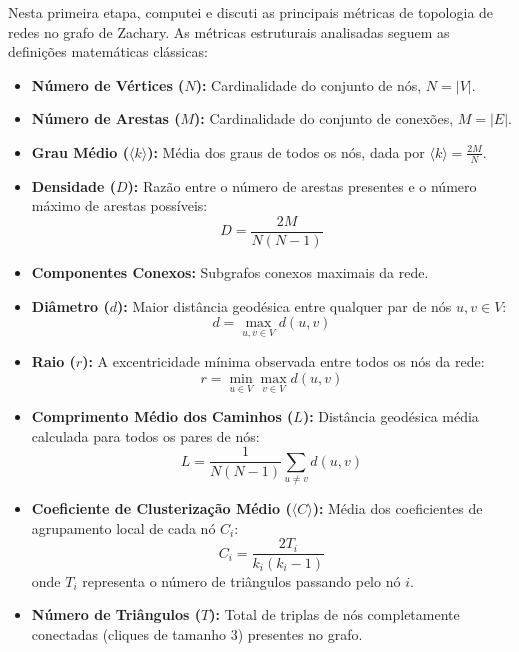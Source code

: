 \documentclass[sigconf]{webmedia}
\begin{document}
Nesta primeira etapa, computei e discuti as principais métricas de topologia de redes no grafo de Zachary. As métricas estruturais analisadas seguem as definições matemáticas clássicas:
\begin{itemize}
    \item \textbf{Número de Vértices ($N$):} Cardinalidade do conjunto de nós, $N = |V|$.
    \item \textbf{Número de Arestas ($M$):} Cardinalidade do conjunto de conexões, $M = |E|$.
    \item \textbf{Grau Médio ($\langle k \rangle$):} Média dos graus de todos os nós, dada por $\langle k \rangle = \frac{2M}{N}$.
    \item \textbf{Densidade ($D$):} Razão entre o número de arestas presentes e o número máximo de arestas possíveis:
    \begin{equation}
        D = \frac{2M}{N(N - 1)}
    \end{equation}
    \item \textbf{Componentes Conexos:} Subgrafos conexos maximais da rede.
    \item \textbf{Diâmetro ($d$):} Maior distância geodésica entre qualquer par de nós $u, v \in V$:
    \begin{equation}
        d = \max_{u, v \in V} d(u, v)
    \end{equation}
    \item \textbf{Raio ($r$):} A excentricidade mínima observada entre todos os nós da rede:
    \begin{equation}
        r = \min_{u \in V} \max_{v \in V} d(u, v)
    \end{equation}
    \item \textbf{Comprimento Médio dos Caminhos ($L$):} Distância geodésica média calculada para todos os pares de nós:
    \begin{equation}
        L = \frac{1}{N(N - 1)} \sum_{u \neq v} d(u, v)
    \end{equation}
    \item \textbf{Coeficiente de Clusterização Médio ($\langle C \rangle$):} Média dos coeficientes de agrupamento local de cada nó $C_i$:
    \begin{equation}
        C_i = \frac{2 T_i}{k_i (k_i - 1)}
    \end{equation}
    onde $T_i$ representa o número de triângulos passando pelo nó $i$.
    \item \textbf{Número de Triângulos ($T$):} Total de triplas de nós completamente conectadas (cliques de tamanho 3) presentes no grafo.
\end{itemize}
\end{document}
